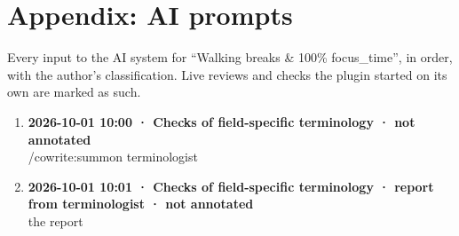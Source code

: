 \section*{Appendix: AI prompts}

Every input to the AI system for “Walking breaks \& 100\% focus\_time”, in order, with the author's classification. Live reviews and checks the plugin started on its own are marked as such.

\begin{enumerate}
  \item \textbf{2026-10-01 10:00 · Checks of field-specific terminology · not annotated} \\
  /cowrite:summon terminologist
  \item \textbf{2026-10-01 10:01 · Checks of field-specific terminology · report from terminologist · not annotated} \\
  the report
\end{enumerate}
